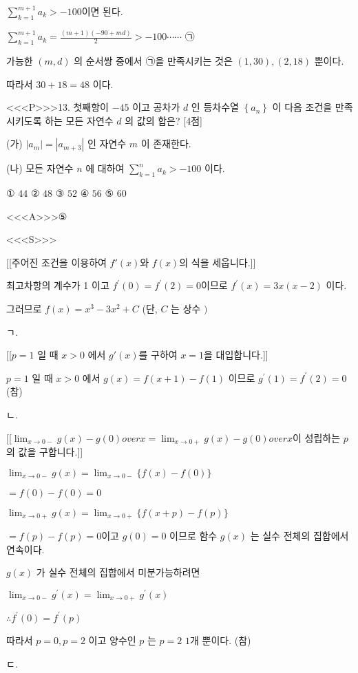 \documentclass{oblivoir}
\begin{document}
$\sum_{k=1}^{m+1} a_{k}>-100 $이면 된다.

$\sum_{k=1}^{m+1} a_{k}=\frac{(m+1)(-90+m d)}{2}>-100 \cdots \cdots $ ㉠

가능한 $(m, d)$ 의 순서쌍 중에서  ㉠을 만족시키는 것은 $(1,30),(2,18)$ 뿐이다.

따라서 $30+18=48$ 이다.

<<<P>>>13. 첫째항이 $-45$ 이고 공차가 $d$ 인 등차수열 $\left\{a_{n}\right\}$ 이 다음 조건을 만족시키도록 하는 모든 자연수 $d$ 의 값의 합은? [4점]

(가) $\left|a_{m}\right|=\left|a_{m+3}\right|$ 인 자연수 $m$ 이 존재한다.

(나) 모든 자연수 $n$ 에 대하여 $\sum_{k=1}^{n} a_{k}>-100$ 이다.

① $44$
② $48$
③ $52$
④ $56$
⑤ $60$

<<<A>>>⑤

<<<S>>>

[[주어진 조건을 이용하여 $f'(x)$와 $f(x)$의 식을 세웁니다.]]

최고차항의 계수가 1 이고 $f^{\prime}(0)=f^{\prime}(2)=0$이므로 $f^{\prime}(x)=3 x(x-2)$ 이다.

그러므로 $f(x)=x^{3}-3 x^{2}+C$ (단, $C$ 는 상수 $)$

ㄱ.

[[$p=1$ 일 때 $x>0$ 에서 $g'(x)$를 구하여 $x=1$을 대입합니다.]]

$p=1$ 일 때 $x>0$ 에서 $g(x)=f(x+1)-f(1)$ 이므로 $g^{\prime}(1)=f^{\prime}(2)=0$ (참)

ㄴ.

[[$\lim _{x \rightarrow 0-} {g(x)-g(0)} over {x} = \lim _{x \rightarrow 0+} {g(x)-g(0)} over {x}$이 성립하는 $p$의 값을 구합니다.]]

$\lim _{x \rightarrow 0-} g(x)=\lim _{x \rightarrow 0-}\{f(x)-f(0)\}$

$=f(0)-f(0)=0$

$\lim _{x \rightarrow 0+} g(x)=\lim _{x \rightarrow 0+}\{f(x+p)-f(p)\}$

$=f(p)-f(p)=0$이고 $g(0)=0$ 이므로 함수 $g(x)$ 는 실수 전체의 집합에서 연속이다.

$g(x)$ 가 실수 전체의 집합에서 미분가능하려면

$\lim _{x \rightarrow 0-} g^{\prime}(x)=\lim _{x \rightarrow 0+} g^{\prime}(x)$

$\therefore f^{\prime}(0)=f^{\prime}(p)$

따라서 $p=0, p=2$ 이고 양수인 $p$ 는 $p=2$ $1$개 뿐이다. (참)

ㄷ.
\end{document}
